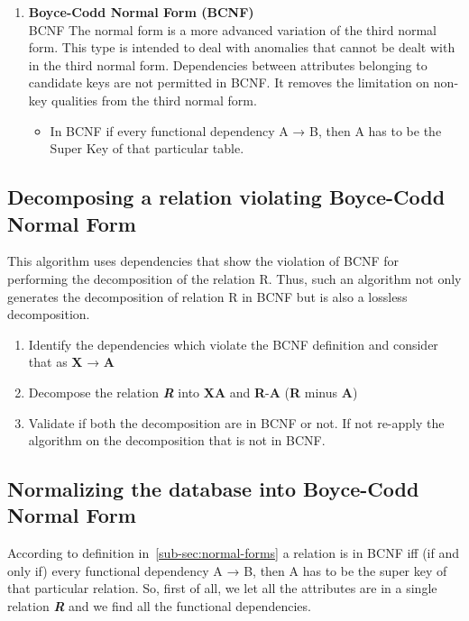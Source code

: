 \begin{enumerate}
\item \textbf{Boyce-Codd Normal Form (BCNF)}\\
BCNF The normal form is a more advanced variation of the third normal form. This type is intended to deal with anomalies that cannot be dealt with in the third normal form. Dependencies between attributes belonging to candidate keys are not permitted in BCNF. It removes the limitation on non-key qualities from the third normal form. 
\begin{itemize}
\item In BCNF if every functional dependency A → B, then A has to be the Super Key of that particular table.
\end{itemize}
\end{enumerate}


\subsection{Decomposing a relation violating Boyce-Codd Normal Form}\label{sub-sec:decomposing-a-relation-bcnf}

This algorithm uses dependencies that show the violation of BCNF for performing the decomposition of the relation R. Thus, such an algorithm not only generates the decomposition of relation R in BCNF but is also a lossless decomposition.\\
\begin{enumerate}
\item Identify the dependencies which violate the BCNF definition and consider that as \textbf{X} → \textbf{A}

\item Decompose the relation \textbf{\textit{R}} into \textbf{XA} and \textbf{R}-\textbf{A} (\textbf{R} minus \textbf{A})

\item Validate if both the decomposition are in BCNF or not. If not re-apply the algorithm on the decomposition that is not in BCNF.




\end{enumerate}


\subsection{Normalizing the database into Boyce-Codd Normal Form}\label{sub-sec:normalizing-bcnf}
According to definition in~\ref{sub-sec:normal-forms} a relation is in BCNF iff (if and only if) every functional dependency A → B, then A has to be the super key of that particular relation. So, first of all, we let all the attributes are in a single relation \textbf{\emph{R}} and we find all the functional dependencies.

